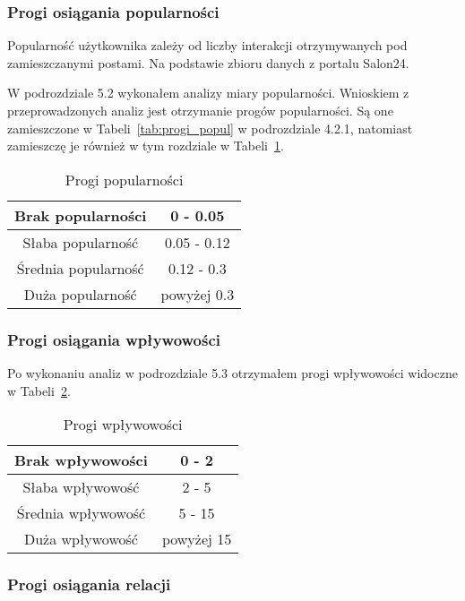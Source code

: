 \documentclass[polish,12pt]{aghthesis}
\begin{document}
\subsubsection{Progi osiągania popularności}
Popularność użytkownika zależy od liczby interakcji otrzymywanych pod zamieszczanymi postami. Na podstawie zbioru danych z portalu Salon24.

W podrozdziale 5.2 wykonałem analizy miary popularności.
Wnioskiem z przeprowadzonych analiz jest otrzymanie progów popularności. Są one zamieszczone w Tabeli~\ref{tab:progi_popul} w podrozdziale 4.2.1, natomiast zamieszczę je również w tym rozdziale w Tabeli~\ref{tab:progi_popul2}.

\begin{table}[h]
\centering
\begin{tabular}{|c|c|}
\hline
Brak popularności & 0 - 0.05 \\
\hline
Słaba popularność & 0.05 - 0.12 \\
\hline
Średnia popularność & 0.12 - 0.3 \\
\hline
Duża popularność & powyżej 0.3 \\
\hline
\end{tabular}
\caption[Progi popularności]{Progi popularności}
\label{tab:progi_popul2}
\end{table}

\FloatBarrier


\subsubsection{Progi osiągania wpływowości}

Po wykonaniu analiz w podrozdziale 5.3 otrzymałem progi wpływowości widoczne w Tabeli~\ref{tab:progi_inf2}.

\begin{table}[h]
\centering
\begin{tabular}{|c|c|}
\hline
Brak wpływowości & 0 - 2 \\
\hline
Słaba wpływowość & 2 - 5 \\
\hline
Średnia wpływowość & 5 - 15 \\
\hline
Duża wpływowość & powyżej 15 \\
\hline
\end{tabular}
\caption[Progi wpływowości]{Progi wpływowości}
\label{tab:progi_inf2}
\end{table}

\FloatBarrier


\subsubsection{Progi osiągania relacji}
\end{document}

